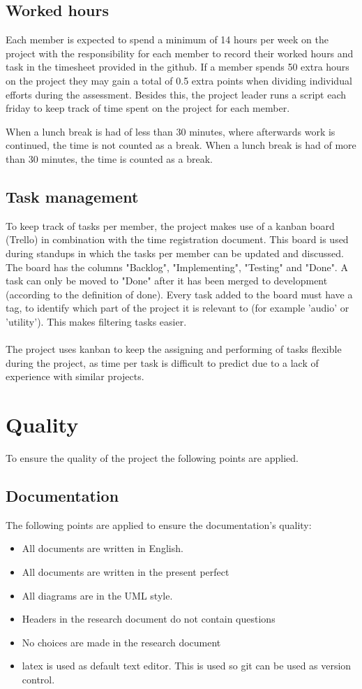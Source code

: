 \documentclass{article} %
\begin{document}
\subsection{Worked hours}
Each member is expected to spend a minimum of 14 hours per week on the project with the responsibility for each member to record their worked hours and task in the timesheet provided in the github.
If a member spends 50 extra hours on the project they may gain a total of 0.5 extra points when dividing individual efforts during the assessment.
Besides this, the project leader runs a script each friday to keep track of time spent on the project for each member.

When a lunch break is had of less than 30 minutes, where afterwards work is continued, the time is not counted as a break.
When a lunch break is had of more than 30 minutes, the time is counted as a break.
\subsection{Task management}

To keep track of tasks per member, the project makes use of a kanban board (Trello) in combination with the time registration document. This board is used during standups in which the tasks per member can be updated and discussed. 
The board has the columns "Backlog", "Implementing", "Testing" and "Done". A task can only be moved to "Done" after it has been merged to development (according to the definition of done).
Every task added to the board must have a tag, to identify which part of the project it is relevant to (for example 'audio' or 'utility'). This makes filtering tasks easier.
\\\\
The project uses kanban to keep the assigning and performing of tasks flexible during the project, as time per task is difficult to predict due to a lack of experience with similar projects.

\newpage

\section{Quality}
To ensure the quality of the project the following points are applied.
\subsection{Documentation}
The following points are applied to ensure the documentation’s quality:
\begin{itemize}
    \item All documents are written in English.
    \item All documents are written in the present perfect
    \item All diagrams are in the UML style.
    \item Headers in the research document do not contain questions
    \item No choices are made in the research document
    \item latex is used as default text editor. This is used so git can be used as version control.
\end{itemize}
\end{document}
